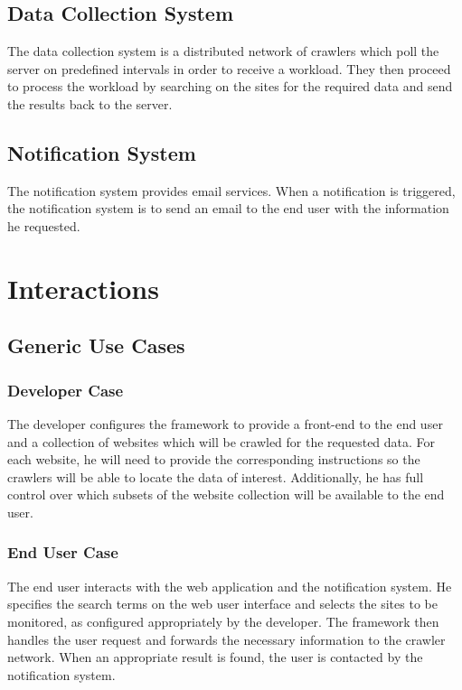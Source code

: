 \documentclass[a4paper,10pt]{article} \usepackage{anysize}
\begin{document}
    \subsection{Data Collection System}
        The data collection system is a distributed network of crawlers which
        poll the server on predefined intervals in order to receive a
        workload. They then proceed to process the workload by searching on
        the sites for the required data and send the results back to the
        server.
    \subsection{Notification System}
        The notification system provides email services. When a notification
        is triggered, the notification system is to send an email to the end
        user with the information he requested.
\section{Interactions}
    \subsection{Generic Use Cases}
        \subsubsection{Developer Case}
            The developer configures the framework to provide a front-end to
            the end user and a collection of websites which will be crawled
            for the requested data. For each website, he will need to provide
            the corresponding instructions so the crawlers will be able to
            locate the data of interest. Additionally, he has full control
            over which subsets of the website collection will be available to
            the end user.
        \subsubsection{End User Case}
            The end user interacts with the web application and the
            notification system. He specifies the search terms on the web user
            interface and selects the sites to be monitored, as configured
            appropriately by the developer. The framework then handles the
            user request and forwards the necessary information to the crawler
            network. When an appropriate result is found, the user is
            contacted by the notification system. 
\end{document}
